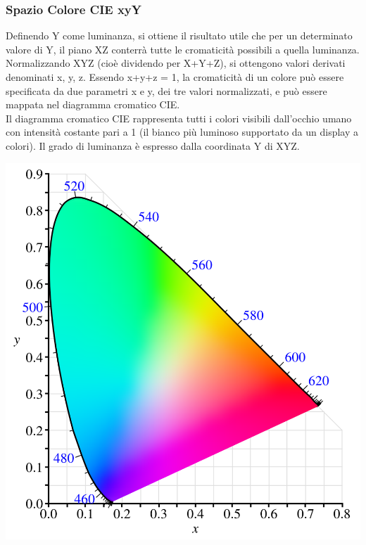 \documentclass[a4paper,11pt]{article} %
\begin{document}
\subsubsection{Spazio Colore CIE xyY}
\begin{minipage}{0.65\textwidth}
Definendo Y come luminanza, si ottiene il risultato utile che per un determinato valore di Y, il piano XZ conterrà tutte le cromaticità possibili a quella luminanza. Normalizzando XYZ (cioè dividendo per X+Y+Z), si ottengono valori derivati denominati x, y, z. Essendo x+y+z = 1, la cromaticità di un colore può essere specificata da due parametri x e y, dei tre valori normalizzati, e può essere mappata nel diagramma cromatico CIE.\\
Il diagramma cromatico CIE rappresenta tutti i colori visibili dall'occhio umano con intensità costante pari a 1 (il bianco più luminoso supportato da un display a colori). Il grado di luminanza è espresso dalla coordinata Y di XYZ.
\end{minipage}
\begin{minipage}{0.05\textwidth}
\end{minipage}
\begin{minipage}{0.3\textwidth}
    \includegraphics[width=\linewidth]{xyYfunction}
\end{minipage}
\end{document}
